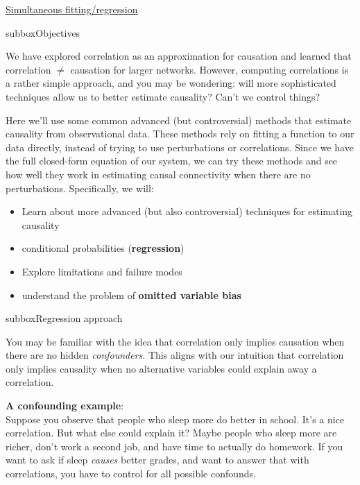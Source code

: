 \begin{textbox}{\href{https://compneuro.neuromatch.io/tutorials/W3D5_NetworkCausality/student/W3D5_Tutorial3.html}{Simultaneous fitting/regression }   }

\begin{subbox}{subbox}{Objectives}
\scriptsize


We have explored correlation as an approximation for causation and learned that correlation $\neq$ causation for larger networks. However, computing correlations is a rather simple approach, and you may be wondering: will more sophisticated techniques allow us to better estimate causality? Can't we control things? 

Here we'll use some common advanced (but controversial) methods that estimate causality from observational data. These methods rely on fitting a function to our data directly, instead of trying to use perturbations or correlations. Since we have the full closed-form equation of our system, we can try these methods and see how well they work in estimating causal connectivity when there are no perturbations. Specifically, we will:

\begin{itemize}
    \item  Learn about more advanced (but also controversial) techniques for estimating causality
    \item conditional probabilities (\textbf{regression})
\item Explore limitations and failure modes
    \item  understand the problem of \textbf{omitted variable bias}
\end{itemize}

\end{subbox}

\begin{subbox}{subbox}{Regression approach}
\scriptsize

You may be familiar with the idea that correlation only implies causation when there are no hidden \textit{confounders}. This aligns with our intuition that correlation only implies causality when no alternative variables could explain away a correlation.

\textbf{A confounding example}:\\
Suppose you observe that people who sleep more do better in school. It's a nice correlation. But what else could explain it? Maybe people who sleep more are richer, don't work a second job, and have time to actually do homework. If you want to ask if sleep \textit{causes} better grades, and want to answer that with correlations, you have to control for all possible confounds.\\


\end{subbox}
\end{textbox}
